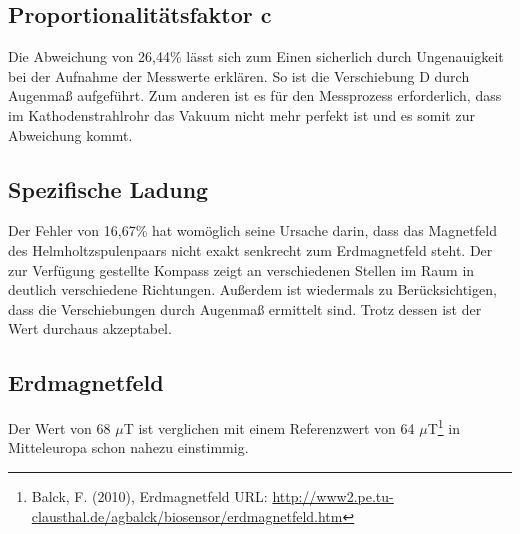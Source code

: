 \subsection{Proportionalitätsfaktor c}
Die Abweichung von 26,44\% lässt sich zum Einen sicherlich durch Ungenauigkeit bei der Aufnahme der Messwerte erklären.
So ist die Verschiebung D durch Augenmaß aufgeführt. Zum anderen ist es für den Messprozess erforderlich, dass im 
Kathodenstrahlrohr das Vakuum nicht mehr perfekt ist und es somit zur Abweichung kommt.
\subsection{Spezifische Ladung}
Der Fehler von 16,67\% hat womöglich seine Ursache darin, dass das Magnetfeld des Helmholtzspulenpaars nicht exakt senkrecht
zum Erdmagnetfeld steht. Der zur Verfügung gestellte Kompass zeigt an verschiedenen Stellen im Raum in deutlich verschiedene Richtungen.
Außerdem ist wiedermals zu Berücksichtigen, dass die Verschiebungen durch Augenmaß ermittelt sind. Trotz dessen ist der Wert
durchaus akzeptabel.
\subsection{Erdmagnetfeld}
Der Wert von 68 $\mu$T ist verglichen mit einem Referenzwert von 64 $\mu$T\footnote[2]{Balck, F. (2010), Erdmagnetfeld URL: \href{http://www2.pe.tu-clausthal.de/agbalck/biosensor/erdmagnetfeld.htm}{http://www2.pe.tu-clausthal.de/agbalck/biosensor/erdmagnetfeld.htm}} in Mitteleuropa schon nahezu einstimmig.








